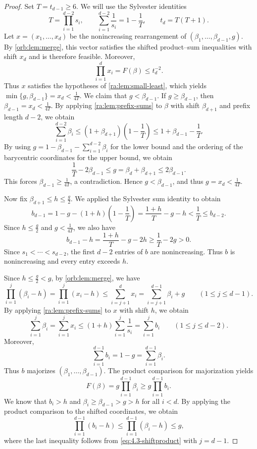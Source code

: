\documentclass[reqno, 11pt]{article}
\numberwithin{equation}{section}
\theoremstyle{definition}
\begin{document}
\begin{proof}
Set $T=t_{d-1}\ge6$.
We will use the Sylvester identities
\[
T=\prod_{i=1}^{d-2}s_i,
\qquad
\sum_{i=1}^{d-2}\frac1{s_i}=1-\frac1T,
\qquad
t_d=T(T+1).
\]
Let $x=(x_1,\ldots,x_d)$ be the nonincreasing rearrangement of $(\beta_1,\ldots,\beta_{d-1},g)$. By \cref{orb:lem:merge}, this vector satisfies the shifted product--sum inequalities with shift $x_d$ and is therefore feasible. Moreover,
\[
\prod_{i=1}^d x_i=F(\beta)\le t_d^{-2}.
\]
Thus $x$ satisfies the hypotheses of \cref{ra:lem:small-least}, which yields $\min\{g,\beta_{d-1}\}=x_d<\frac{1}{4T}$.
We claim that $g<\beta_{d-1}$. If $g\ge\beta_{d-1}$, then $\beta_{d-1}=x_d<\frac{1}{4T}$. By applying \cref{ra:lem:prefix-sums} to $\beta$ with shift $\beta_{d+1}$ and prefix length $d-2$, we obtain
\[
\sum_{i=1}^{d-2}\beta_i
\le(1+\beta_{d+1})\left(1-\frac1T\right)
\le1+\beta_{d-1}-\frac1T.
\]
By using $g=1-\beta_{d-1}-\sum_{i=1}^{d-2}\beta_i$ for the lower bound and the ordering of the barycentric coordinates for the upper bound, we obtain
\[
\frac1T-2\beta_{d-1}
\le g=\beta_d+\beta_{d+1}
\le2\beta_{d-1}.
\]
This forces $\beta_{d-1}\ge\frac{1}{4T}$, a contradiction. Hence $g<\beta_{d-1}$, and thus $g=x_d<\frac{1}{4T}$.

Now fix $\beta_{d+1}\le h\le \frac{g}{2}$. 
We applied the Sylvester sum identity to obtain
\[
b_{d-1}
=1-g-(1+h)\left(1-\frac1T\right)
=\frac{1+h}{T}-g-h
<\frac1T
\le b_{d-2}.
\]
Since $h\le \frac{g}{2}$ and $g<\frac{1}{4T}$, we also have
\[
b_{d-1}-h
=\frac{1+h}{T}-g-2h
\ge\frac1T-2g>0.
\]
Since $s_1<\cdots<s_{d-2}$, the first $d-2$ entries of $b$
are nonincreasing.
Thus $b$ is nonincreasing and every entry exceeds $h$.

Since $h\le \frac{g}{2}<g$, by \cref{orb:lem:merge}, we have 
\begin{equation}\label{eq:4.3-shiftproduct}
\prod_{i=1}^j(\beta_i-h)
=\prod_{i=1}^j(x_i-h)
\le\sum_{i=j+1}^d x_i
=\sum_{i=j+1}^{d-1}\beta_i+g
\qquad(1\le j\le d-1).
\end{equation}
By applying \cref{ra:lem:prefix-sums} to $x$ with shift $h$, we obtain
\[
\sum_{i=1}^j\beta_i
=\sum_{i=1}^j x_i
\le(1+h)\sum_{i=1}^j\frac1{s_i}
=\sum_{i=1}^j b_i
\qquad(1\le j\le d-2).
\]
Moreover,
\[
\sum_{i=1}^{d-1}b_i
=1-g
=\sum_{i=1}^{d-1}\beta_i.
\]
Thus $b$ majorizes $(\beta_1,\ldots,\beta_{d-1})$. The product comparison for majorization yields
\begin{equation}\label{eq-g-bound_1}
F(\beta)
=g\prod_{i=1}^{d-1}\beta_i
\ge g\prod_{i=1}^{d-1}b_i.
\end{equation}
We know that $b_i>h$ and $\beta_i\ge\beta_{d-1}>g>h$ for all $i<d$. By applying the product comparison to the shifted coordinates, we obtain 
\begin{equation}\label{eq-g-bound}
\prod_{i=1}^{d-1}(b_i-h)
\le\prod_{i=1}^{d-1}(\beta_i-h)
\le g,
\end{equation}
where the last inequality follows from \eqref{eq:4.3-shiftproduct} with $j=d-1$.


\end{proof}
\end{document}
